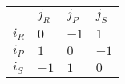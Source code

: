 \begin{center}
    \begin{tabular}{llll}
                                 & $j_R$    & $j_P$     & $j_S$                         \\ \cline{2-4}
    \multicolumn{1}{l|}{$i_R$}   & $0$      & $-1$      & \multicolumn{1}{l|}{$1$}  \\
    \multicolumn{1}{l|}{$i_P$}   & $1$      & $0$       & \multicolumn{1}{l|}{$-1$}  \\
    \multicolumn{1}{l|}{$i_S$}   & $-1$     & $1$       & \multicolumn{1}{l|}{$0$}  \\ \cline{2-4}
    \end{tabular}
\end{center}